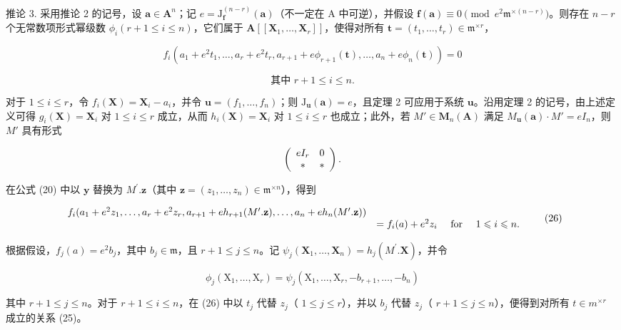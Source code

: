 推论 3. 采用推论 2 的记号，设 \(\mathbf{a} \in \mathbf{A}^n\)；记 \(e = \mathrm{J}_{\mathbf{f}}^{(n-r)}(\mathbf{a})\)（不一定在 A 中可逆），并假设 \(\mathbf{f}(\mathbf{a}) \equiv 0 \pmod{e^2\mathfrak{m}^{\times(n-r)}}\)。则存在 \(n - r\) 个无常数项形式幂级数 \(\phi_i (r + 1 \leqslant i \leqslant n)\)，它们属于 \(\mathbf{A}[[\mathbf{X}_1, \ldots, \mathbf{X}_r]]\)，使得对所有 \(\mathbf{t} = (t_1, \ldots, t_r) \in \mathfrak{m}^{\times r}\)，

\[
f _ {i} \left(a _ {1} + e ^ {2} t _ {1}, \dots , a _ {r} + e ^ {2} t _ {r}, a _ {r + 1} + e \phi_ {r + 1} (\mathbf {t}), \dots , a _ {n} + e \phi_ {n} (\mathbf {t})\right) = 0
\]

\[
\text{其中 } r + 1 \leqslant i \leqslant n.
\]

对于 \(1 \leqslant i \leqslant r\)，令 \(f_{i}(\mathbf{X}) = \mathbf{X}_{i} - a_{i}\)，并令 \(\mathbf{u} = (f_{1}, \ldots, f_{n})\)；则 \(\mathrm{J}_{\mathbf{u}}(\mathbf{a}) = e\)，且定理 2 可应用于系统 \(\mathbf{u}\)。沿用定理 2 的记号，由上述定义可得 \(g_{i}(\mathbf{X}) = \mathbf{X}_{i}\) 对 \(1 \leqslant i \leqslant r\) 成立，从而 \(h_{i}(\mathbf{X}) = \mathbf{X}_{i}\) 对 \(1 \leqslant i \leqslant r\) 也成立；此外，若 \(M' \in \mathbf{M}_{n}(\mathbf{A})\) 满足 \(M_{\mathbf{u}}(\mathbf{a}) \cdot M' = eI_{n}\)，则 \(M'\) 具有形式

\[
\left( \begin{array}{c c} e I _ {r} & 0 \\ * & * \end{array} \right).
\]

在公式 (20) 中以 \(\mathbf{y}\) 替换为 \(M^{\prime}.\mathbf{z}\)（其中 \(\mathbf{z} = (z_{1},\ldots ,z_{n})\in \mathfrak{m}^{\times n}\)），得到

\[
\begin{array}{r l} f _ {i} (a _ {1} + e ^ {2} z _ {1}, \dots , a _ {r} + e ^ {2} z _ {r}, a _ {r + 1} + e h _ {r + 1} (M ^ {\prime}. \mathbf {z}), \dots , a _ {n} + e h _ {n} (M ^ {\prime}. \mathbf {z})) \\ & = f _ {i} (a) + e ^ {2} z _ {i} \quad \text { for } \quad 1 \leqslant i \leqslant n. \end{array}\tag{26}
\]

根据假设，\(f_{j}(a) = e^{2}b_{j}\)，其中 \(b_{j} \in \mathfrak{m}\)，且 \(r + 1 \leqslant j \leqslant n\)。记 \(\psi_{j}(\mathbf{X}_{1},\ldots ,\mathbf{X}_{n}) = h_{j}(M^{\prime}.\mathbf{X})\)，并令

\[
\phi_ {j} \left(\mathrm{X} _ {1}, \dots , \mathrm{X} _ {r}\right) = \psi_ {j} \left(\mathrm{X} _ {1}, \dots , \mathrm{X} _ {r}, - b _ {r + 1}, \dots , - b _ {n}\right)
\]

其中 \(r + 1 \leqslant j \leqslant n\)。对于 \(r + 1 \leqslant i \leqslant n\)，在 (26) 中以 \(t_j\) 代替 \(z_j\)（ \(1 \leqslant j \leqslant r\)），并以 \(b_j\) 代替 \(z_j\)（ \(r + 1 \leqslant j \leqslant n\)），便得到对所有 \(t \in m^{\times r}\) 成立的关系 (25)。


